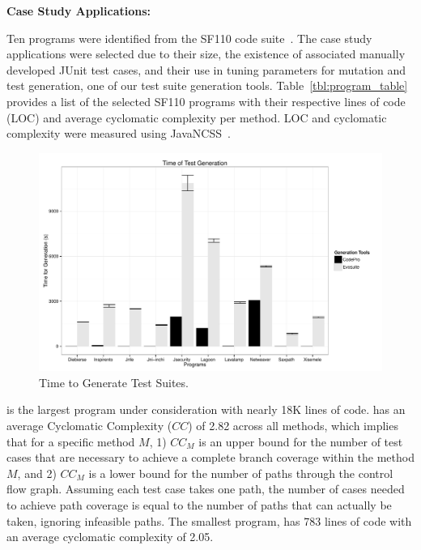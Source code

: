 \noindent \textbf{Case Study Applications:}  

Ten programs were identified from the SF110 code suite~\cite{fraser:2012}.  The case study applications were selected due to their size, the existence of associated manually developed JUnit test cases, and their use in tuning \evo parameters for mutation and test generation, one of our test suite generation tools.  Table~\ref{tbl:program_table} provides a list of the selected SF110 programs with their respective lines of code (LOC) and average cyclomatic complexity per method.  LOC and cyclomatic complexity were measured using JavaNCSS~\cite{leejavancss}.  

\begin{figure}[!t]
\centering
  \includegraphics[scale=0.5]{RGraphs/TimeOfGeneration.pdf}
    \caption{Time to Generate Test Suites.}
  \label{fig:TimeGen}
\end{figure}

\netweaver is the largest program under consideration with nearly 18K lines of code.  \netweaver has an average Cyclomatic Complexity ($CC$) of 2.82 across all methods, which implies that for a specific method $M$, 1) $CC_M$ is an upper bound for the number of test cases that are necessary to achieve a complete branch coverage within the method $M$, and 2) $CC_M$ is a lower bound for the number of paths through the control flow graph. Assuming each test case takes one path, the number of cases needed to achieve path coverage is equal to the number of paths that can actually be taken, ignoring infeasible paths.  The smallest program, \jni has 783 lines of code with an average cyclomatic complexity of 2.05.  

